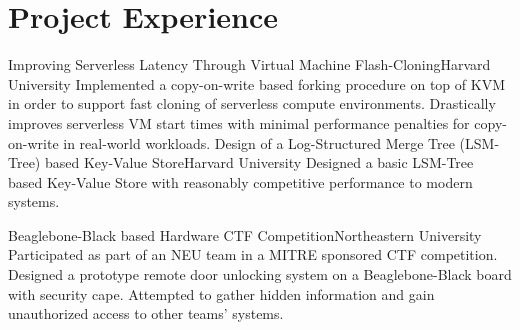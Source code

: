 \section{Project Experience}

{Improving Serverless Latency Through Virtual Machine Flash-Cloning}{Harvard University}{}
{ Implemented a copy-on-write based forking procedure on top of KVM in order to support fast cloning of serverless compute environments. Drastically improves serverless VM start times with minimal performance penalties for copy-on-write in real-world workloads.
}
{Design of a Log-Structured Merge Tree (LSM-Tree) based Key-Value Store}{Harvard
University}{}
{ Designed a basic LSM-Tree based Key-Value Store with reasonably competitive
performance to modern systems. \\
}

{Beaglebone-Black based Hardware CTF Competition}{Northeastern
University}{}
{ Participated as part of an NEU team in a MITRE sponsored CTF competition. Designed a prototype
  remote door unlocking system on a Beaglebone-Black board with security cape. Attempted to
  gather hidden information and gain unauthorized access to other teams' systems. \\
}
